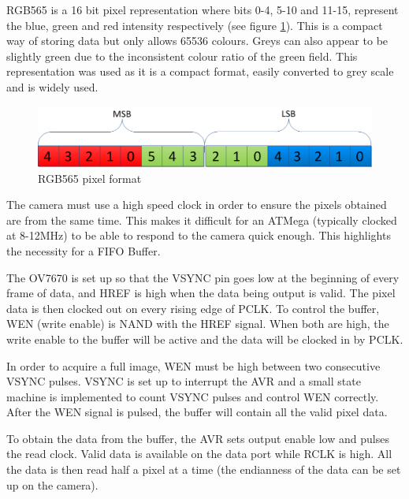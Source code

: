 RGB565 is a 16 bit pixel representation where bits 0-4, 5-10 and 11-15, represent the blue, green and red intensity respectively (see figure \ref{fig:RGB565}). This is a compact way of storing data but only allows 65536 colours. Greys can also appear to be slightly green due to the inconsistent colour ratio of the green field. This representation was used as it is a compact format, easily converted to grey scale and is widely used.
\begin{figure}
\includegraphics[width = \textwidth]{./Figures/RGB565.png}
\caption{RGB565 pixel format}
\label{fig:RGB565}
\end{figure}

The camera must use a high speed clock in order to ensure the pixels obtained are from the same time. This makes it difficult for an ATMega (typically clocked at 8-12MHz) to be able to respond to the camera quick enough. This highlights the necessity for a FIFO Buffer. 

The OV7670 is set up so that the VSYNC pin goes low at the beginning of every frame of data, and HREF is high when the data being output is valid. The pixel data is then clocked out on every rising edge of PCLK. To control the buffer, WEN (write enable) is NAND with the HREF signal. When both are high, the write enable to the buffer will be active and the data will be clocked in by PCLK. 

In order to acquire a full image, WEN must be high between two consecutive VSYNC pulses. VSYNC is set up to interrupt the AVR and a small state machine is implemented to count VSYNC pulses and control WEN correctly. After the WEN signal is pulsed, the buffer will contain all the valid pixel data.

To obtain the data from the buffer, the AVR sets output enable low and pulses the read clock. Valid data is available on the data port while RCLK is high. All the data is then read half a pixel at a time (the endianness of the data can be set up on the camera). 

